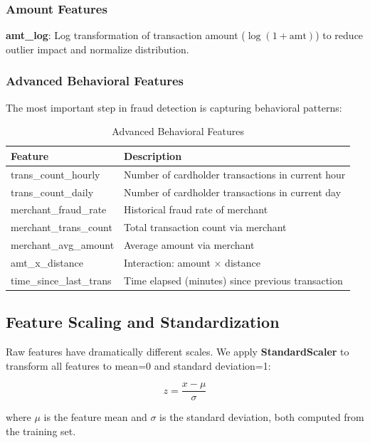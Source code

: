 \subsubsection{Amount Features}

\textbf{amt\_log}: Log transformation of transaction amount ($\log(1 + \text{amt})$) to reduce outlier impact and normalize distribution.

\subsubsection{Advanced Behavioral Features}

The most important step in fraud detection is capturing behavioral patterns:

\begin{table}[H]
\centering
\caption{Advanced Behavioral Features}
\footnotesize
\begin{tabular}{|l|p{6cm}|}
\hline
\textbf{Feature} & \textbf{Description} \\
\hline
trans\_count\_hourly & Number of cardholder transactions in current hour \\
\hline
trans\_count\_daily & Number of cardholder transactions in current day \\
\hline
merchant\_fraud\_rate & Historical fraud rate of merchant \\
\hline
merchant\_trans\_count & Total transaction count via merchant \\
\hline
merchant\_avg\_amount & Average amount via merchant \\
\hline
amt\_x\_distance & Interaction: amount $\times$ distance \\
\hline
time\_since\_last\_trans & Time elapsed (minutes) since previous transaction \\
\hline
\end{tabular}
\end{table}

\subsection{Feature Scaling and Standardization}

Raw features have dramatically different scales. We apply \textbf{StandardScaler} to transform all features to mean=0 and standard deviation=1:

\[z = \frac{x - \mu}{\sigma}\]

where $\mu$ is the feature mean and $\sigma$ is the standard deviation, both computed from the training set.

